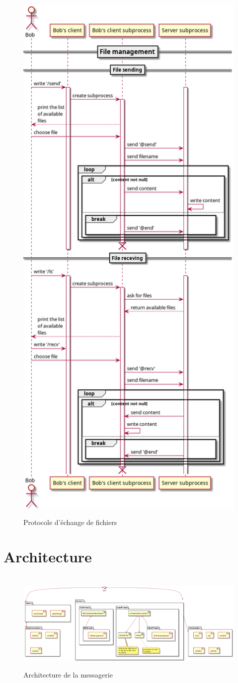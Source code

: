 \documentclass[a4paper,12pt]{article}
\begin{document}
\pagebreak

\begin{figure}[h!]
	\centering
	\hrulefill\\
	\includegraphics[width=0.6\linewidth]{fileManagement.png}
	\caption{Protocole d'échange de fichiers}
	\hrulefill
\end{figure}

\pagebreak
\section{Architecture}
\begin{figure}[h]
	\centering
	\hrulefill\\
	\includegraphics[width=\linewidth]{architecture.png}
	\caption{Architecture de la messagerie}
	\hrulefill
\end{figure}
\end{document}
